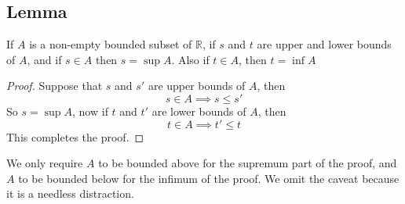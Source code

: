 \documentclass[../../main.tex]{subfiles}
\begin{document}
\subsection{Lemma}
\begin{lemma}\label{lemma:contained_sup_inf}
    If $A$ is a non-empty bounded subset of $\mathbb{R}$, if $s$ and $t$ are upper and lower bounds of $A$, and if $s\in A$ then $s=\sup A$. Also if $t\in A$, then $t = \inf A$
\end{lemma}
\begin{proof}
    Suppose that $s$ and $s'$ are upper bounds of $A$, then
    \[
    s\in A\implies s\leq s'
    \]
    So $s=\sup A$, now if $t$ and $t'$ are lower bounds of $A$, then
    \[
    t\in A\implies t'\leq t
    \]
    This completes the proof.
\end{proof}
\remark We only require $A$ to be bounded above for the supremum part of the proof, and $A$ to be bounded below for the infimum of the proof. We omit the caveat because it is a needless distraction.
\end{document}
